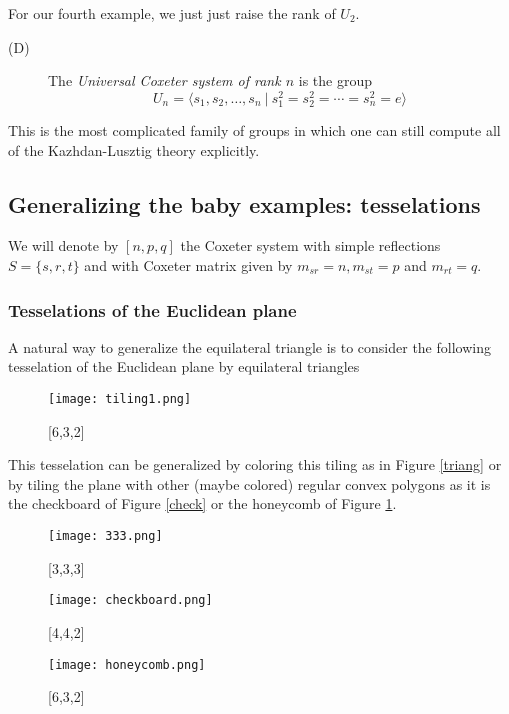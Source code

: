 \documentclass[12pt]{wart}
\theoremstyle{remark}
\begin{document}
For our fourth example, we just   just raise the rank of $U_2$. 

\begin{description}
\item[(D)]  The \emph{Universal Coxeter system of rank $n$} is the group 
$$ {U}_n=\langle s_1, s_2, \ldots, s_n\ \vert \ s_1^2=s_2^2=\cdots=s_n^2=e\rangle$$
\end{description} 

This is the most complicated family of groups in which one can still compute all of the Kazhdan-Lusztig theory explicitly. 


\subsection{Generalizing the baby examples:  tesselations}

We will denote by $[n,p,q]$ the Coxeter system with simple reflections $S=\{s,r,t\}$ and with Coxeter matrix  given by $m_{sr}=n, m_{st}=p$ and $m_{rt}=q.$

\subsubsection{Tesselations of the Euclidean plane}
A natural way to generalize the equilateral triangle is to consider the following tesselation of the Euclidean plane by equilateral triangles

\begin{figure}[H] 
\begin{center}
 \texttt{[image: tiling1.png]}
\caption{[6,3,2]}  
\end{center}
\end{figure} 


This tesselation can be generalized by coloring this tiling as in Figure \ref{triang} or by tiling the plane with other (maybe colored) regular convex polygons as it is the checkboard of Figure \ref{check} or the  honeycomb of Figure \ref{honey}.\begin{figure}[H]
\begin{minipage}[t]{0.30\linewidth}
    \texttt{[image: 333.png]}
    \caption{[3,3,3]}
    \label{triang}
\end{minipage}
    \hfill
\begin{minipage}[t]{0.30\linewidth}
    \texttt{[image: checkboard.png]}
    \caption{ [4,4,2]}
    \label{check}
\end{minipage} 
   \hfill
\begin{minipage}[t]{0.30\linewidth}
    \texttt{[image: honeycomb.png]}
    \caption{[6,3,2]}
    \label{honey}
\end{minipage} 
\end{figure}
\end{document}
